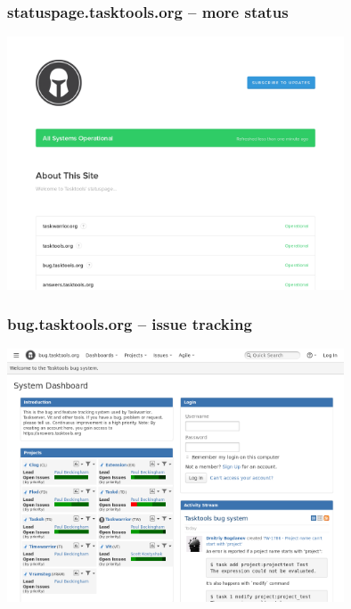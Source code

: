 \documentclass[t,handout]{beamer}
\begin{document}
\begin{frame}\frametitle{statuspage.tasktools.org -- more status}
    \begin{center}
        \href{http://statuspage.tasktools.org/}{\includegraphics[width=10cm,height=7.5cm]{statuspage-tasktools-org.png}}
    \end{center}
\end{frame}

\begin{frame}\frametitle{bug.tasktools.org -- issue tracking}
    \begin{center}
        \href{https://bug.tasktools.org/}{\includegraphics[width=10cm,height=7.5cm]{bug-tasktools-org.png}}
    \end{center}
\end{frame}
\end{document}

